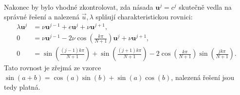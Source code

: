 \documentclass[10pt,a4paper]{article}
\begin{document}
Nakonec by bylo vhodné zkontrolovat, zda násada $\bm{u}^j = c^j$ skutečně vedla na správné řešení a nalezená $\vec{u}, \lambda$ splňují charakteristickou rovnici:
\begin{align*}
    \lambda \bm{u}^j &= \nu \bm{u}^{j-1} + e \bm{u}^j + \nu \bm{u}^{j+1},
    \\[10pt]
    0 &= \nu \bm{u}^{j-1} - 2\nu \cos\left(\frac{k\pi}{N+1}\right) \bm{u}^j + \nu \bm{u}^{j+1},
    \\[10pt]
    0 &= \sin\left( \frac{(j-1)k\pi}{N+1} \right) + \sin\left( \frac{(j+1)k\pi}{N+1} \right) - 2 \cos\left(\frac{k\pi}{N+1}\right)\sin\left( \frac{jk\pi}{N+1} \right).
\end{align*}
Tato rovnost je zřejmá ze vzorce $\sin(a+b) = \cos(a)\sin(b) + \sin(a)\cos(b)$, nalezená řešení jsou tedy platná.
\end{document}
